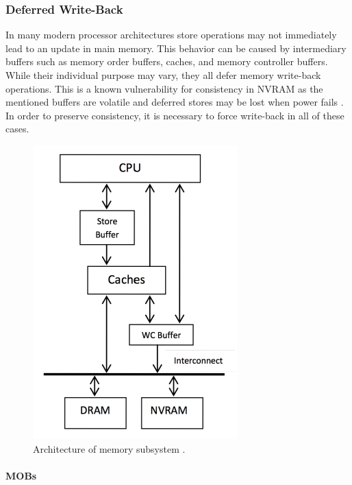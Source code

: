 \subsubsection{Deferred Write-Back}

In many modern processor architectures store operations may not immediately
lead to an update in main memory. This behavior can be caused by intermediary
buffers such as memory order buffers, caches, and memory controller buffers.
While their individual purpose may vary, they all defer memory write-back
operations. This is a known vulnerability for consistency in \ac{NVRAM} as the
mentioned buffers are volatile and deferred stores may be lost when power fails
\cite{condit2009better, oukid2017data}. In order to preserve consistency, it is
necessary to force write-back in all of these cases.

\begin{figure}[h!]
    \centering
    \includegraphics[scale=0.75]{figures/nvram-memory-subsystem.pdf}
    \caption{Architecture of memory subsystem \cite{bhandari2012implications}.}
    \label{fig:memory-interface}
\end{figure}

\paragraph{\acp{MOB}}

